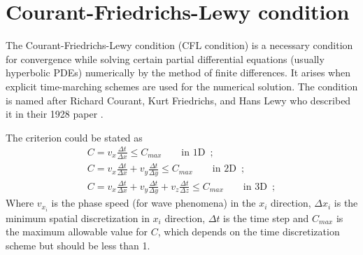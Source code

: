 \documentclass[12pt,letterpaper]{article}
\begin{document}
\section{Courant-Friedrichs-Lewy condition}

The Courant-Friedrichs-Lewy condition (CFL condition) is a necessary condition for convergence while solving certain partial differential equations (usually hyperbolic PDEs) numerically by the method of finite differences. It arises when explicit time-marching schemes are used for the numerical solution. The condition is named after Richard Courant, Kurt Friedrichs, and Hans Lewy who described it in their 1928 paper
\cite{CFL}.

The criterion could be stated as 
\begin{align*}
C=v_{x}\frac{\Delta t}{\Delta x}\leq C_{max}\qquad\mbox{in 1D}\enspace;\\
C=v_{x}\frac{\Delta t}{\Delta x}+v_{y}\frac{\Delta t}{\Delta y}\leq C_{max}\qquad\mbox{in 2D}\enspace;\\
C=v_{x}\frac{\Delta t}{\Delta x}+v_{y}\frac{\Delta t}{\Delta y}+v_{z}\frac{\Delta t}{\Delta z}\leq C_{max}\qquad\mbox{in 3D}\enspace;
\end{align*}
 Where $v_{x_{i}}$ is the phase speed (for wave phenomena) in the $x_{i}$ direction, $\Delta x_{i}$ is the minimum spatial discretization in $x_{i}$ direction, $\Delta t$ is the time step and $C_{max}$ is the maximum allowable value for $C$, which depends on the time discretization scheme but should be less than 1.
\end{document}
